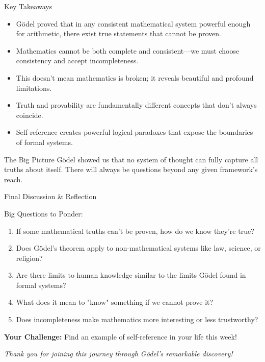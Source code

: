 \documentclass[aspectratio=169]{beamer}
\begin{document}
\begin{frame}{Key Takeaways}

\begin{itemize}
    \item Gödel proved that in any consistent mathematical system powerful enough for arithmetic, there exist true statements that cannot be proven.
    \item Mathematics cannot be both complete and consistent—we must choose consistency and accept incompleteness.
    \item This doesn't mean mathematics is broken; it reveals beautiful and profound limitations.
    \item Truth and provability are fundamentally different concepts that don't always coincide.
    \item Self-reference creates powerful logical paradoxes that expose the boundaries of formal systems.
\end{itemize}

\begin{alertblock}{The Big Picture}
Gödel showed us that no system of thought can fully capture all truths about itself. There will always be questions beyond any given framework's reach.
\end{alertblock}

\end{frame}

\begin{frame}{Final Discussion \& Reflection}

\begin{block}{Big Questions to Ponder:}
\begin{enumerate}
    \item If some mathematical truths can't be proven, how do we know they're true?
    \item Does Gödel's theorem apply to non-mathematical systems like law, science, or religion?
    \item Are there limits to human knowledge similar to the limits Gödel found in formal systems?
    \item What does it mean to "know" something if we cannot prove it?
    \item Does incompleteness make mathematics more interesting or less trustworthy?
\end{enumerate}
\end{block}

\vspace{0.3cm}
\begin{center}
\textbf{Your Challenge:} Find an example of self-reference in your life this week!

\vspace{0.2cm}
\textit{Thank you for joining this journey through Gödel's remarkable discovery!}
\end{center}

\end{frame}
\end{document}
